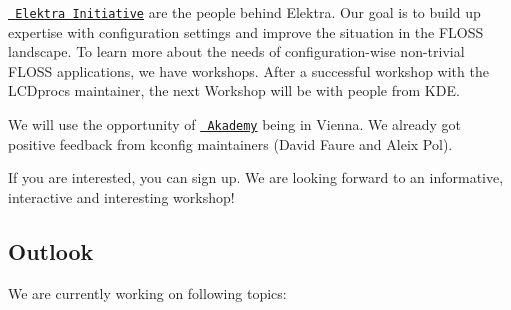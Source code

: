 \href{https://www.libelektra.org/developers/authors}{\texttt{ Elektra Initiative}} are the people behind Elektra. Our goal is to build up expertise with configuration settings and improve the situation in the F\+L\+O\+SS landscape. To learn more about the needs of configuration-\/wise non-\/trivial F\+L\+O\+SS applications, we have workshops. After a successful workshop with the L\+C\+Dproc\textquotesingle{}s maintainer, the next Workshop will be with people from K\+DE.

We will use the opportunity of \href{https://akademy.kde.org/2018}{\texttt{ Akademy}} being in Vienna. We already got positive feedback from kconfig maintainers (David Faure and Aleix Pol).

If you are interested, you can sign up. We are looking forward to an informative, interactive and interesting workshop!\hypertarget{doc_news_2018-05-13_0_8_23_md_autotoc_md2210}{}\subsection{Outlook}\label{doc_news_2018-05-13_0_8_23_md_autotoc_md2210}
We are currently working on following topics\+:


